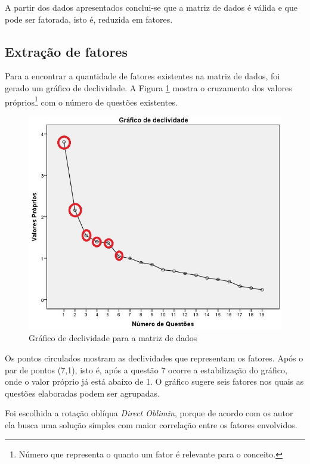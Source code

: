 A partir dos dados apresentados conclui-se que a matriz de dados é válida e que pode ser fatorada, isto é, reduzida em fatores.
 



\subsection{Extração de fatores}
\label{ExtraçãodeFatores}
Para a encontrar a quantidade de fatores existentes na matriz de dados, foi gerado um gráfico de declividade. A Figura \ref{grafico_declividade} mostra o cruzamento dos valores próprios\footnote{Número que representa o quanto um fator é relevante para o conceito. } com o número de questões existentes. 

\begin{figure}[!htb]
\centering
\includegraphics[keepaspectratio=true,scale=0.5]{figuras/Ques_2/graficodeclividade.jpg}
\caption{Gráfico de declividade para a matriz de dados}
\label{grafico_declividade}
\end{figure}

Os pontos circulados mostram as declividades que representam os fatores. Após o par de pontos (7,1), isto é, após a questão 7 ocorre a estabilização do gráfico, onde o valor próprio já está abaixo de 1. O gráfico sugere seis fatores nos quais as questões elaboradas podem ser agrupadas. 

Foi escolhida a rotação oblíqua \textit{Direct Oblimin}, porque de acordo com os autor \cite{DAMASIO2012} ela busca uma solução simples com maior correlação entre os fatores envolvidos.

